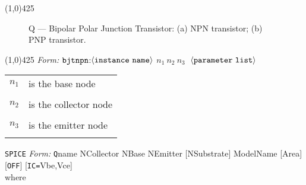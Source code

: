 \documentclass{article}
\begin{document}
\hrulefill\linethickness{0.5mm}\line(1,0){425} \normalsize
\newline
\begin{figure}[h]
\centerline{\epsfxsize=4in} \caption[Q --- bipolar
junction transistor element]{Q --- Bipolar Polar Junction
Transistor: (a) NPN transistor; (b) PNP transistor.}
\end{figure}
\newline
\linethickness{0.5mm}\line(1,0){425}
\newline
\textit{\FDA Form:}
$\tt bjtnpn$:$\langle \tt{instance\ name}\rangle$ $n_1\ n_2\ n_3\
$ $\langle \tt{parameter\ list}\rangle$
\newline
\begin{tabular}{r l}
$n_1$ & is the base node \\
&  \\
$n_2$ & is the collector node \\
&  \\
$n_3$ & is the emitter node \\
& \\
\end{tabular}
\newline
\noindent\texttt{SPICE} \textit{Form:}
\newline
{\tt Q}name  NCollector NBase NEmitter  [NSubstrate]  ModelName
[Area] [{\tt OFF}] {\tt} [{\tt IC=}Vbe,Vce] \\
where \\
\end{document}
